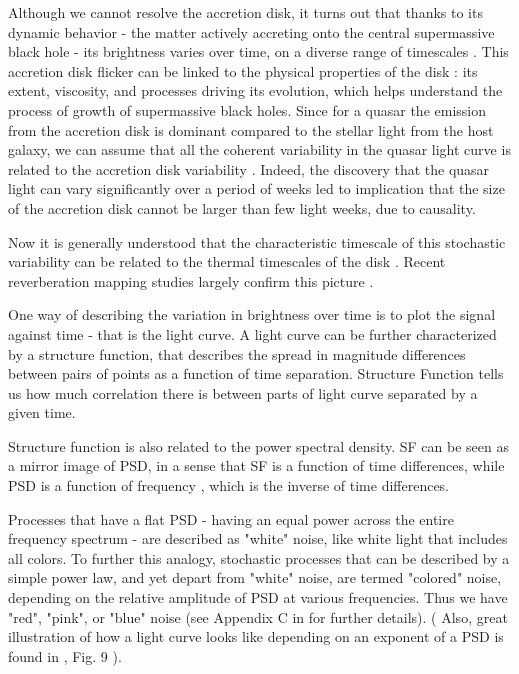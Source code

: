 \documentclass[modern]{aastex62}
\begin{document}
Although we cannot resolve the accretion disk, it turns out that thanks to its dynamic behavior  - the matter actively accreting onto the central supermassive black hole - its brightness varies over time, on a diverse range of timescales \citep{schawinski2015}. This accretion disk flicker can be linked to the physical properties of the disk : its extent, viscosity, and processes driving its evolution, which helps understand the process of growth of supermassive black holes.  Since for a quasar the emission from the accretion disk is dominant compared to the stellar light from the host galaxy, we can assume that all the coherent variability  in the quasar light curve is related to the accretion disk variability . Indeed, the discovery that the quasar light can vary significantly over a period of weeks led to implication that the size of the accretion disk cannot be larger than few light weeks, due to causality. 

Now it is generally understood that the characteristic timescale of this stochastic  variability can be related to the thermal timescales of the disk \citep{kelly2007, zu2013, kozlowski2016a}. Recent reverberation mapping studies largely confirm this picture \citep{sun2015}.


One way of describing the variation in brightness over time is to plot the signal against time - that is the light curve.  A light curve can be further characterized by a structure function, that describes the spread in magnitude differences between pairs of points as a function of time separation. Structure Function tells us how much correlation there is between parts of light curve separated by a given time.  

Structure function is also related to the power spectral density. SF can be seen as a mirror image of PSD, in a sense that SF is a function of time differences, while PSD is a function of frequency , which is the inverse of  time differences. 

Processes that have a flat PSD - having an equal power across the entire frequency spectrum -  are described as "white" noise, like white light that includes all colors. To further this analogy, stochastic processes that can be described by a simple power law, and yet depart from "white" noise, are termed  "colored" noise, depending on the relative amplitude of PSD at various frequencies. Thus we have "red", "pink", or "blue" noise   (see Appendix  C in \cite{kasliwal2017} for further details). ( Also, great illustration of how a light curve looks like depending on an exponent of a PSD is found in \cite{macleod2010}, Fig. 9 ). 
\end{document}
